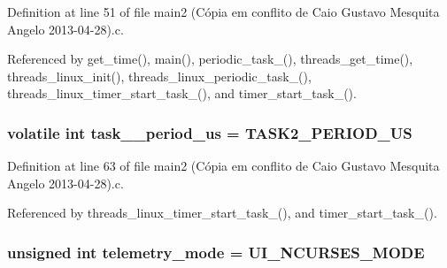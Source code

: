 Definition at line 51 of file main2 (\-Cópia em conflito de Caio Gustavo Mesquita Angelo 2013-\/04-\/28).\-c.



Referenced by get\-\_\-time(), main(), periodic\-\_\-task\-\_(), threads\-\_\-get\-\_\-time(), threads\-\_\-linux\-\_\-init(), threads\-\_\-linux\-\_\-periodic\-\_\-task\-\_(), threads\-\_\-linux\-\_\-timer\-\_\-start\-\_\-task\-\_(), and timer\-\_\-start\-\_\-task\-\_().

\hypertarget{main2_01_07C_xC3_xB3pia_01em_01conflito_01de_01Caio_01Gustavo_01Mesquita_01Angelo_012013-04-28_08_8c_a5166d431d5448a1538e75f5469c19c7b}{
\subsubsection[{task\-\_\-2\-\_\-period\-\_\-us}]{\setlength{\rightskip}{0pt plus 5cm}volatile int task\-\_\-\_\-period\-\_\-us = {\bf T\-A\-S\-K2\-\_\-\-P\-E\-R\-I\-O\-D\-\_\-\-U\-S}}}\label{main2_01_07C_xC3_xB3pia_01em_01conflito_01de_01Caio_01Gustavo_01Mesquita_01Angelo_012013-04-28_08_8c_a5166d431d5448a1538e75f5469c19c7b}


Definition at line 63 of file main2 (\-Cópia em conflito de Caio Gustavo Mesquita Angelo 2013-\/04-\/28).\-c.



Referenced by threads\-\_\-linux\-\_\-timer\-\_\-start\-\_\-task\-\_(), and timer\-\_\-start\-\_\-task\-\_().

\hypertarget{main2_01_07C_xC3_xB3pia_01em_01conflito_01de_01Caio_01Gustavo_01Mesquita_01Angelo_012013-04-28_08_8c_a5045187bb0afe92c41ce73bc602fd3ca}{
\subsubsection[{telemetry\-\_\-mode}]{\setlength{\rightskip}{0pt plus 5cm}unsigned int telemetry\-\_\-mode = {\bf U\-I\-\_\-\-N\-C\-U\-R\-S\-E\-S\-\_\-\-M\-O\-D\-E}}}\label{main2_01_07C_xC3_xB3pia_01em_01conflito_01de_01Caio_01Gustavo_01Mesquita_01Angelo_012013-04-28_08_8c_a5045187bb0afe92c41ce73bc602fd3ca}


